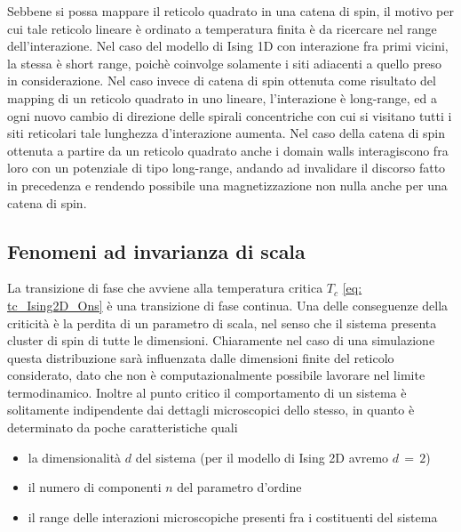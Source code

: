 Sebbene si possa mappare il reticolo quadrato in una catena di spin, il motivo per cui tale reticolo lineare è ordinato a temperatura 
finita è da ricercare nel range dell'interazione. Nel caso del modello di Ising 1D con interazione fra primi vicini, la stessa è short 
range, poichè coinvolge solamente i siti adiacenti a quello preso in considerazione. Nel caso invece di catena di spin ottenuta come 
risultato del mapping di un reticolo quadrato in uno lineare, l'interazione è long-range, ed a ogni nuovo cambio di direzione delle 
spirali concentriche con cui si visitano tutti i siti reticolari tale lunghezza d'interazione aumenta. Nel caso della catena di 
spin ottenuta a partire da un reticolo quadrato anche i domain walls interagiscono fra loro con un potenziale di tipo long-range, andando 
ad invalidare il discorso fatto in precedenza e rendendo possibile una magnetizzazione non nulla anche per una catena di spin. 





\subsection{Fenomeni ad invarianza di scala}

La transizione di fase che avviene alla temperatura critica $T_c$ \eqref{eq: tc_Ising2D_Ons} è una transizione di fase continua. Una delle 
conseguenze della criticità è la perdita di un parametro di scala, nel senso che il sistema presenta cluster di spin di tutte le dimensioni. 
Chiaramente nel caso di una simulazione questa distribuzione sarà influenzata dalle dimensioni finite del reticolo considerato, dato che 
non è computazionalmente possibile lavorare nel limite termodinamico. Inoltre al punto critico il comportamento di un sistema è 
solitamente indipendente dai dettagli microscopici dello stesso, in quanto è determinato da poche caratteristiche quali

\begin{itemize}[label=$\diamond$] 
    \item la dimensionalità $d$ del sistema (per il modello di Ising 2D avremo $d\,=\,2$)
    \item il numero di componenti $n$ del parametro d'ordine
    \item il range delle interazioni microscopiche presenti fra i costituenti del sistema
\end{itemize}


